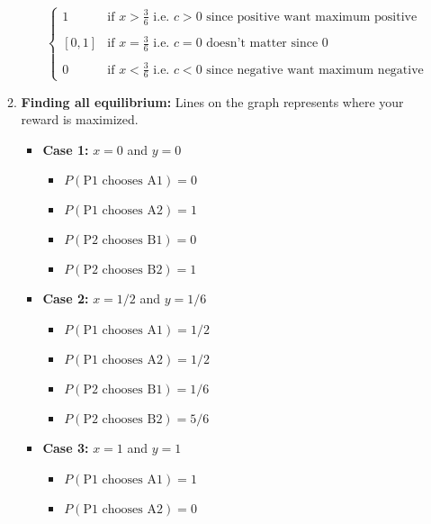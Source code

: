 \begin{example}
\begin{enumerate}
\begin{enumerate}
\begin{itemize}
\begin{equation*}
\begin{cases}
                        1 & \text{if } x > \frac{3}{6} \text{ i.e. } c > 0 \text{ since positive want maximum positive}\\
                        & \\
                        [0,1] & \text{if } x=\frac{3}{6} \text{ i.e. }c = 0 \text{ doesn't matter since 0} \\
                        & \\
                        0 & \text{if } x < \frac{3}{6} \text{ i.e. } c < 0 \text{ since negative want maximum negative}
                    \end{cases}
                \end{equation*}
            \end{itemize}
            \item \textbf{Finding all equilibrium:} Lines on the graph represents where your reward is maximized. 
            \begin{itemize}
                \item \textbf{Case 1:} $x=0$ and $y=0$
                \begin{itemize}
                    \item $P(\text{P1 chooses A1}) = 0$ 
                    \item $P(\text{P1 chooses A2}) = 1$
                    \item $P(\text{P2 chooses B1}) = 0$
                    \item $P(\text{P2 chooses B2}) = 1$
                \end{itemize}
                \item \textbf{Case 2:} $x=1/2$ and $y=1/6$
                \begin{itemize}
                    \item $P(\text{P1 chooses A1}) = 1/2$
                    \item $P(\text{P1 chooses A2}) = 1/2$
                    \item $P(\text{P2 chooses B1}) = 1/6$
                    \item $P(\text{P2 chooses B2}) = 5/6$
                \end{itemize}
                \item \textbf{Case 3:} $x=1$ and $y=1$
                \begin{itemize}
                    \item $P(\text{P1 chooses A1}) = 1$
                    \item $P(\text{P1 chooses A2}) = 0$

\end{itemize}
\end{itemize}
\end{enumerate}
\end{enumerate}
\end{example}
